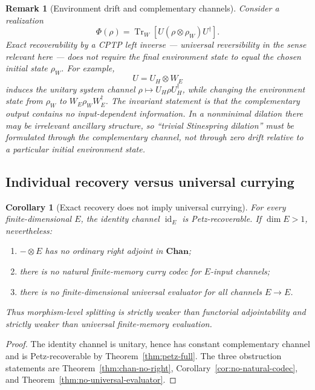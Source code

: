 \documentclass[11pt]{article}
\newtheorem{corollary}[theorem]{Corollary}
\newtheorem{remark}[theorem]{Remark}
\DeclareMathOperator{\Tr}{Tr}
\DeclareMathOperator{\id}{id}
\begin{document}
\begin{remark}[Environment drift and complementary channels]
\label{rem:environment-drift}
Consider a realization
\[
\Phi(\rho)=\Tr_W[U(\rho\otimes\rho_W)U^\dagger].
\]
Exact recoverability by a CPTP left inverse --- universal reversibility in
the sense relevant here --- does not require the final environment state to
equal the chosen initial state $\rho_W$. For example,
\[
U=U_H\otimes W_E
\]
induces the unitary system channel $\rho\mapsto U_H\rho U_H^\dagger$, while
changing the environment state from $\rho_W$ to $W_E\rho_W W_E^\dagger$.
The invariant statement is that the complementary output contains no
input-dependent information. In a nonminimal dilation there may be
irrelevant ancillary structure, so ``trivial Stinespring dilation'' must be
formulated through the complementary channel, not through zero drift
relative to a particular initial environment state.
\end{remark}

\subsection{Individual recovery versus universal currying}

\begin{corollary}[Exact recovery does not imply universal currying]
\label{cor:recovery-not-currying}
For every finite-dimensional $E$, the identity channel $\id_E$ is
Petz-recoverable. If $\dim E>1$, nevertheless:
\begin{enumerate}
\item $-\otimes E$ has no ordinary right adjoint in $\mathbf{Chan}$;
\item there is no natural finite-memory curry codec for $E$-input channels;
\item there is no finite-dimensional universal evaluator for all channels
$E\to E$.
\end{enumerate}
Thus morphism-level splitting is strictly weaker than functorial
adjointability and strictly weaker than universal finite-memory evaluation.
\end{corollary}

\begin{proof}
The identity channel is unitary, hence has constant complementary channel
and is Petz-recoverable by Theorem~\ref{thm:petz-full}. The three
obstruction statements are Theorem~\ref{thm:chan-no-right},
Corollary~\ref{cor:no-natural-codec}, and
Theorem~\ref{thm:no-universal-evaluator}.
\end{proof}
\end{document}
